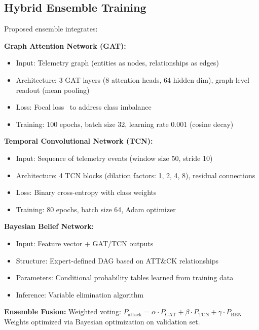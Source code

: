\subsection{Hybrid Ensemble Training}
Proposed ensemble integrates:

\textbf{Graph Attention Network (GAT):}
\begin{itemize}
    \item Input: Telemetry graph (entities as nodes, relationships as edges)
    \item Architecture: 3 GAT layers (8 attention heads, 64 hidden dim), graph-level readout (mean pooling)
    \item Loss: Focal loss~\cite{lin2017focal} to address class imbalance
    \item Training: 100 epochs, batch size 32, learning rate 0.001 (cosine decay)
\end{itemize}

\textbf{Temporal Convolutional Network (TCN):}
\begin{itemize}
    \item Input: Sequence of telemetry events (window size 50, stride 10)
    \item Architecture: 4 TCN blocks (dilation factors: 1, 2, 4, 8), residual connections
    \item Loss: Binary cross-entropy with class weights
    \item Training: 80 epochs, batch size 64, Adam optimizer
\end{itemize}

\textbf{Bayesian Belief Network:}
\begin{itemize}
    \item Input: Feature vector + GAT/TCN outputs
    \item Structure: Expert-defined DAG based on ATT\&CK relationships
    \item Parameters: Conditional probability tables learned from training data
    \item Inference: Variable elimination algorithm
\end{itemize}

\textbf{Ensemble Fusion:}
Weighted voting: $P_{\text{attack}} = \alpha \cdot P_{\text{GAT}} + \beta \cdot P_{\text{TCN}} + \gamma \cdot P_{\text{BBN}}$
Weights optimized via Bayesian optimization on validation set.

